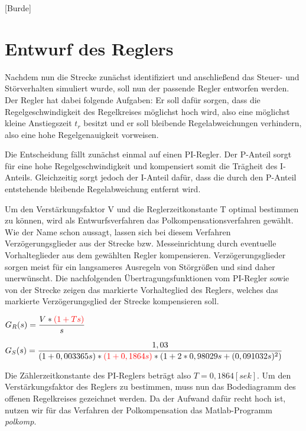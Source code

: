 
\newpage

[Burde]

\section{Entwurf des Reglers}

Nachdem nun die Strecke zunächst identifiziert und anschließend das Steuer- und Störverhalten simuliert wurde, soll nun der passende Regler entworfen werden. Der Regler hat dabei folgende Aufgaben: Er soll dafür sorgen, dass die Regelgeschwindigkeit des Regelkreises möglichst hoch wird, also eine möglichst kleine Anstiegszeit $t_{r}$ besitzt und er soll bleibende Regelabweichungen verhindern, also eine hohe Regelgenauigkeit vorweisen.

Die Entscheidung fällt zunächst einmal auf einen PI-Regler. Der P-Anteil sorgt für eine hohe Regelgeschwindigkeit und kompensiert somit die Trägheit des I-Anteils. Gleichzeitig sorgt jedoch der I-Anteil dafür, dass die durch den P-Anteil entstehende bleibende Regelabweichung entfernt wird. 

Um den Verstärkungsfaktor V und die Reglerzeitkonstante T optimal bestimmen zu können, wird als Entwurfsverfahren das Polkompensationsverfahren gewählt. Wie der Name schon aussagt, lassen sich bei diesem Verfahren Verzögerungsglieder aus der Strecke bzw. Messeinrichtung durch eventuelle Vorhalteglieder aus dem gewählten Regler kompensieren. Verzögerungsglieder sorgen meist für ein langsameres Ausregeln von Störgrößen und sind daher unerwünscht. Die nachfolgenden Übertragungsfunktionen vom PI-Regler sowie von der Strecke zeigen das markierte Vorhalteglied des Reglers, welches das markierte Verzögerungsglied der Strecke kompensieren soll. 

\begin{center}
$ G_{R}(s) = \dfrac{V*\textcolor{red}{(1+Ts)}}{s} $
\end{center}

\begin{center}
$ G_{S}(s) = \dfrac{1,03}{(1 + 0,003365s) * \textcolor{red}{(1 + 0,1864s)} * (1 + 2*0,98029s + (0,091032s)^{2}) }$
\end{center}

Die Zählerzeitkonstante des PI-Reglers beträgt also $ T = 0,1864[sek] $. Um den Verstärkungsfaktor des Reglers zu bestimmen, muss nun das Bodediagramm des offenen Regelkreises gezeichnet werden. Da der Aufwand dafür recht hoch ist, nutzen wir für das Verfahren der Polkompensation das Matlab-Programm \textit{polkomp}. 

